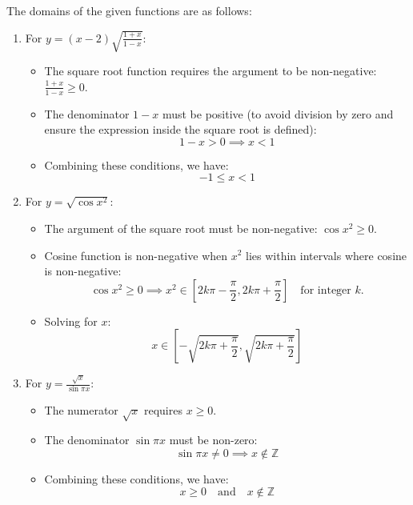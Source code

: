 \begin{solution}
The domains of the given functions are as follows:
\begin{enumerate}
    \item For \( y = (x-2) \sqrt{\frac{1+x}{1-x}} \):
    \begin{itemize}
        \item The square root function requires the argument to be non-negative: \( \frac{1+x}{1-x} \geq 0 \).
        \item The denominator \( 1-x \) must be positive (to avoid division by zero and ensure the expression inside the square root is defined):
        \[
        1-x > 0 \implies x < 1
        \]
        \item Combining these conditions, we have:
        \[
        -1 \leq x < 1
        \]
    \end{itemize}
    
    \item For \( y = \sqrt{\cos x^2} \):
    \begin{itemize}
        \item The argument of the square root must be non-negative: \( \cos x^2 \geq 0 \).
        \item Cosine function is non-negative when \( x^2 \) lies within intervals where cosine is non-negative:
        \[
        \cos x^2 \geq 0 \implies x^2 \in \left[2k\pi - \frac{\pi}{2}, 2k\pi + \frac{\pi}{2}\right] \quad \text{for integer } k.
        \]
        \item Solving for \( x \):
        \[
        x \in \left[-\sqrt{2k\pi + \frac{\pi}{2}}, \sqrt{2k\pi + \frac{\pi}{2}}\right]
        \]
    \end{itemize}

    \item For \( y = \frac{\sqrt{x}}{\sin \pi x} \):
    \begin{itemize}
        \item The numerator \( \sqrt{x} \) requires \( x \geq 0 \).
        \item The denominator \( \sin \pi x \) must be non-zero:
        \[
        \sin \pi x \neq 0 \implies x \notin \mathbb{Z}
        \]
        \item Combining these conditions, we have:
        \[
        x \geq 0 \quad \text{and} \quad x \notin \mathbb{Z}
        \]
    \end{itemize}


\end{enumerate}
\end{solution}
